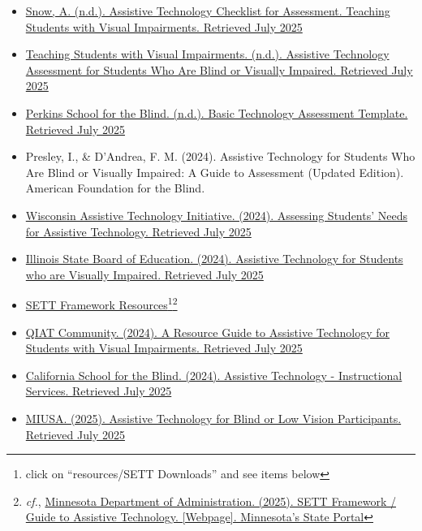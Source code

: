 \begin{itemize}
 \item \href{https://www.teachingvisuallyimpaired.com/assistive-technology-assessment.html}{Snow, A. (n.d.). Assistive Technology Checklist for Assessment. Teaching Students with Visual Impairments. Retrieved July 2025}
 \item \href{http://www.teachingvisuallyimpaired.com/uploads/1/4/1/2/14122361/at_assessment_revised.pdf}{Teaching Students with Visual Impairments. (n.d.). Assistive Technology Assessment for Students Who Are Blind or Visually Impaired. Retrieved July 2025}
 \item \href{https://www.perkins.org/sites/elearning.perkinsdev1.org/files/Basic\%20Technology\%20Assessment\%20Template\_0\_0.docx}{Perkins School for the Blind. (n.d.). Basic Technology Assessment Template. Retrieved July 2025}
 \item Presley, I., \& D'Andrea, F. M. (2024). Assistive Technology for Students Who Are Blind or Visually Impaired: A Guide to Assessment (Updated Edition). American Foundation for the Blind.
 \item \href{https://www.wati.org/free-publications/assessing-students-needs-for-assistive-technology/}{Wisconsin Assistive Technology Initiative. (2024). Assessing Students' Needs for Assistive Technology. Retrieved July 2025}
 \item \href{https://www.isbe.net/Documents/Assistive-Technology-Students-Visually-Impaired.pdf}{Illinois State Board of Education. (2024). Assistive Technology for Students who are Visually Impaired. Retrieved July 2025}
 \item \href{https://www.joyzabala.com/links-resources}{SETT Framework Resources}\footnote{\raggedright click on ``resources/SETT Downloads'' and see items below}\footnote{\raggedright \emph{cf.}, \href{https://mn.gov/admin/at/learning/prek-12/sett-framework.jsp}{Minnesota Department of Administration. (2025). SETT Framework / Guide to Assistive Technology. [Webpage]. Minnesota's State Portal}}
 \item \href{https://www.qiat.org/docs/resourcebank/TEBO_VI_Resource_Guide.pdf}{QIAT Community. (2024). A Resource Guide to Assistive Technology for Students with Visual Impairments. Retrieved July 2025}
 \item \href{https://www.csb-cde.ca.gov/instruction/assistivetech/index.aspx}{California School for the Blind. (2024). Assistive Technology - Instructional Services. Retrieved July 2025}
 \item \href{https://miusa.org/resource/tip-sheets/assistivetechnologyforblind/}{MIUSA. (2025). Assistive Technology for Blind or Low Vision Participants. Retrieved July 2025}
\end{itemize}

